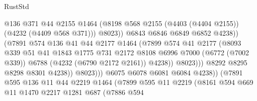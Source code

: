 \begin{lexlean}{RustStd}
\begin{coremodule}
                                      @136
                                      @371
                                      @44
                                      @2155
                                      @1464
                                      (@8198
                                        @568
                                        @2155
                                        (@4403 (@4404 @2155))
                                        (@4232 (@4409 @568 @371)))
                                      @8023))
                                  @6843
                                  @6846
                                  @6849
                                  @6852
                                  @4238))
                              (@7891
                                @574
                                @136
                                @41
                                @44
                                @2177
                                @1464
                                (@7899
                                  @574
                                  @41
                                  @2177
                                  (@8093
                                    @339
                                    @51
                                    @41
                                    @1843
                                    @1775
                                    @731
                                    @2172
                                    @8108
                                    @6996
                                    @7000
                                    (@6772 (@7002 @339))
                                    @6788
                                    (@4232 (@6790 @2172 @2161))
                                    @4238))
                                @8023)))
                          @8292
                          @8295
                          @8298
                          @8301
                          @4238))
                      @8023)))
                @6075
                @6078
                @6081
                @6084
                @4238))
            (@7891
              @595
              @136
              @11
              @44
              @2219
              @1464
              (@7899
                @595
                @11
                @2219
                (@8161
                  @594
                  @669
                  @11
                  @1470
                  @2217
                  @1281
                  @687
                  (@7886
                    @594

\end{coremodule}
\end{lexlean}

